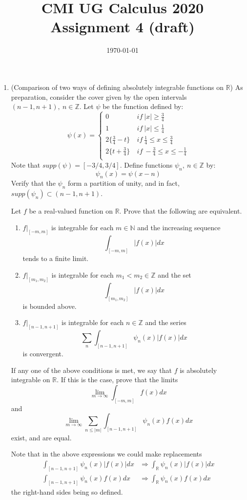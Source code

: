 \documentclass[11pt]{amsart}
\newcommand{\bbR}{\mathbb{R}}
\newcommand{\bbZ}{\mathbb{Z}}
\newcommand{\bbN}{\mathbb{N}}
\theoremstyle{definition}
\begin{document}
\title{CMI UG Calculus 2020 Assignment 4 (draft)}
\date{\today}
\maketitle

\begin{enumerate}[wide, labelwidth=!, labelindent=0pt]

\item (Comparison of two ways of defining absolutely integrable functions on $\bbR$)
As preparation, consider the cover given by the open intervals $(n-1,n+1), \ n \in \bbZ$. Let $\psi$ be the function defined by:
\[
\psi(x)=
\begin{cases}
0 \ &if \ |x| \ge \frac{3}{4}\\
1 \ &if \ |x| \le \frac{1}{4}\\
2 \{\frac{3}{4}-t\} \ &if \ \frac{1}{4} \le x \le \frac{3}{4}\\
2\{t+\frac{3}{4}\} \ &if \ -\frac{3}{4} \le x \le -\frac{1}{4}\\
\end{cases}
\]
Note that $supp(\psi)=[-3/4,3/4]$.
Define functions $\psi_n, \ n \in \bbZ$ by:
\[
\psi_n(x)=\psi(x-n)
\]
Verify that the $\psi_n$ form a partition of unity, and in fact, $supp(\psi_n) \subset (n-1,n+1)$.

Let $f$ be a real-valued function on $\bbR$. Prove that the following are equivalent.
\begin{enumerate}
\item $f|_{[-m,m]}$ is integrable for each $m \in \bbN$ and the increasing sequence
\[
\int_{[-m,m]} |f(x)| dx
\]
tends to a finite limit.
\item $f|_{[m_1,m_2]}$ is integrable for each $m_1 < m_2 \in \bbZ$ and the set
\[
\int_{[m_1,m_2]} |f(x)| dx
\]
is bounded above.
\item $f|_{[n-1,n+1]}$ is  integrable for each $n \in \bbZ$ and the series
\[
\sum_n \int_{[n-1,n+1]} \psi_n (x) |f (x)| dx
\]
is convergent.
\end{enumerate}
If any one of the above conditions is met, we say that $f$ is absolutely integrable on $\bbR$. If this is the case, prove that the limits
\[
\lim_{m \to \infty} \int_{[-m,m]} f(x) dx
\]
and
\[
\lim_{m \to \infty} \sum_{n \le |m|} \int_{[n-1,n+1]} \psi_n(x) f(x) dx
\]
exist, and are equal.

Note that in the above expressions we could make replacements
\[
\begin{split}
\int_{[n-1,n+1]} \psi_n (x) |f (x)| dx &\Rightarrow \int_{\bbR} \psi_n (x) |f (x)| dx\\
\int_{[n-1,n+1]} \psi_n (x) f (x) dx &\Rightarrow \int_{\bbR} \psi_n (x) f(x) dx
\end{split}
\]
the right-hand sides being so defined. 


\end{enumerate}
\end{document}
